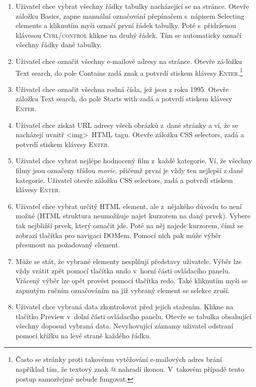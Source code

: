 \documentclass[thesis=B,czech]{FITthesis}[2012/06/26]
\begin{document}
\begin{enumerate}
	\item Uživatel chce vybrat všechny řádky tabulky nacházející se na stránce. Otevře záložku \textsf{Basics}, zapne manuální označování přepínačem s~nápisem \textsf{Selecting elements} a kliknutím myši označí první řádek tabulky. Poté s~přidrženou klávesou \textsc{Ctrl/control} klikne na druhý řádek. Tím se automaticky označí všechny řádky dané tabulky.
	\item Uživatel chce označit všechny e-mailové adresy na stránce. Otevře zá-ložku \textsf{Text search}, do pole \textsf{Contains} zadá znak  a potvrdí stiskem klávesy \textsc{Enter}.\footnote{Často se stránky proti takovému vytěžování e-mailových adres brání například tím, že textový znak @ nahradí ikonou. V~takovém případě tento postup samozřejmě nebude fungovat.}
	\item Uživatel chce označit všechna rodná čísla, jež jsou z roku 1995. Otevře záložku \textsf{Text search}, do pole \textsf{Starts with} zadá  a potvrdí stiskem klávesy \textsc{Enter}.
	\item Uživatel chce získat URL adresy všech obrázků z~dané stránky a ví, že se nacházejí uvnitř \textless img\textgreater~HTML tagu. Otevře záložku \textsf{CSS selectors}, zadá  a potvrdí stiskem klávesy \textsc{Enter}.
	\item Uživatel chce vybrat nejlépe hodnocený film z~každé kategorie. Ví, že všechny filmy jsou označeny třídou \textit{movie}, přičemž první je vždy ten nejlepší z dané kategorie. Uživatel otevře záložku \textsf{CSS selectors}, zadá  a potvrdí stiskem klávesy \textsc{Enter}.
	\item Uživatel chce vybrat určitý HTML element, ale z~nějakého důvodu to není možné (HTML struktura neumožňuje najet kurzorem na daný prvek). Vybere tak nejbližší prvek, který označit jde. Poté na něj najede kurzorem, čímž se zobrazí tlačítka pro navigaci DOMem. Pomocí nich pak může výběr přesunout na požadovaný element.
	\item Může se stát, že vybrané elementy nesplňují představy uživatele. Výběr lze vždy vrátit zpět pomocí tlačítka \textsf{undo} v~horní části ovládacího panelu. Vrácený výběr lze opět provést pomocí tlačítka \textsf{redo}. Také kliknutím myši se zapnutým ručním označováním na již vybraný element se selekce zruší.
	\item Uživatel chce vybraná data zkontrolovat před jejich stažením. Klikne na tlačítko \textsf{Preview} v~dolní části ovládacího panelu. Otevře se tabulka obsahující všechny doposud vybraná data. Nevyhovující záznamy uživatel odstraní pomocí křížku na levé straně každého řádku.
\end{enumerate}
\end{document}
